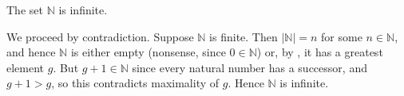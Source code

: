 \begin{theorem}
\label{thmNIsInfinite}
The set $\mathbb{N}$ is infinite.
\end{theorem}

\begin{cproof}
We proceed by contradiction. Suppose $\mathbb{N}$ is finite. Then $|\mathbb{N}| = n$ for some $n \in \mathbb{N}$, and hence $\mathbb{N}$ is either empty (nonsense, since $0 \in \mathbb{N}$) or, by , it has a greatest element $g$. But $g+1 \in \mathbb{N}$ since every natural number has a successor, and $g+1 > g$, so this contradicts maximality of $g$. Hence $\mathbb{N}$ is infinite.
\end{cproof}